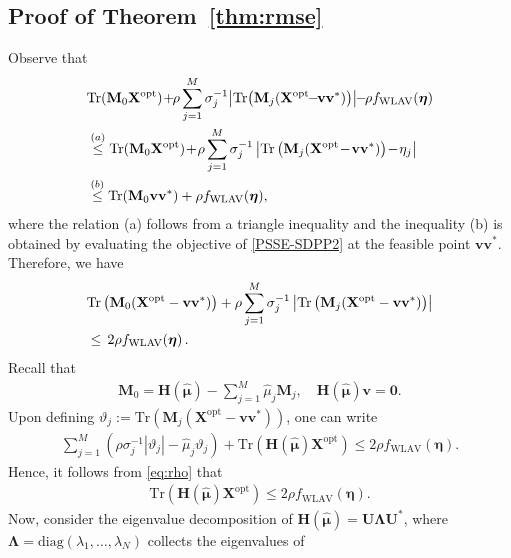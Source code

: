 \documentclass[journal,twoside]{IEEEtran}
\newcommand{\diag}{{\mathrm {diag}}}
\newcommand{\Tr}{\mathrm{Tr}}
\newcommand{\bv}{\mathbf{v}}
\newcommand{\bH}{\mathbf{H}}
\newcommand{\bM}{\mathbf{M}}
\newcommand{\bU}{\mathbf{U}}
\newcommand{\bX}{\mathbf{X}}
\newcommand{\bLambda}{\bm{\Lambda}}
\begin{document}
\subsection{Proof of Theorem~\ref{thm:rmse}}\label{appendix:rmse}
Observe that \begin{align}
&\Tr(\bM_0 {\bX}^{\mathrm{opt}})\!+\!\! \rho \sum_{j=1}^M \sigma_j^{-1}\!\left|\Tr\!\left(\bM_j({\bX}^{\mathrm{opt}}\!\!-\!\!\bv\bv^{*})\right)\right|\!\!-\!\!\rho f_{\mathrm{WLAV}}(\boldsymbol{\eta}) \notag  \\
&\stackrel{(a)}{\leq}\Tr(\bM_0{\bX}^{\mathrm{opt}})\!+\!\rho \sum_{j=1}^M \sigma_j^{-1}\left|\Tr\left(\bM_j({\bX}^{\mathrm{opt}}\!-\!\bv\bv^{*})\right)\!-\!\eta_j\right|  \notag \\
&\stackrel{(b)}{\leq} \Tr(\bM_0\bv\bv^{*}) + \rho f_{\mathrm{WLAV}}(\boldsymbol{\eta}), \label{bound}
\end{align}
where the relation (a) follows from a triangle inequality and the inequality (b) is obtained by evaluating the objective of \eqref{PSSE-SDPP2} at the feasible point $\bv\bv^{*}$.
Therefore, we have
\begin{align}
&\Tr\left(\bM_0({\bX}^{\mathrm{opt}}-\bv\bv^{*})\right) + \rho \sum_{j=1}^M \sigma_j^{-1}\left|\Tr\left(\bM_j({\bX}^{\mathrm{opt}}-\bv\bv^{*})\right)\right| \notag \\
&\leq\,  2\rho f_{\mathrm{WLAV}}(\boldsymbol{\eta})\, .
\label{bound2}
\end{align}
Recall that
\begin{align*}
\bM_{0} = \bH(\hat{\boldsymbol{\mu}}) - \sum_{j=1}^M\hat{\mu}_j\bM_{j}, \quad   \bH(\hat{\boldsymbol{\mu}})\bv = \mathbf{0}.
\end{align*}
Upon defining $\vartheta_j:=\Tr\left(\bM_j({\bX}^{\mathrm{opt}}-\bv\bv^{*})\right)$, one can write
\begin{align}
\!\!\!\!\sum_{j=1}^M (\rho \sigma_j^{-1}|\vartheta_j|-\hat{\mu}_j\vartheta_j)\!+\! \Tr(\bH(\hat{\boldsymbol{\mu}}){\bX}^{\mathrm{opt}})\!\leq\!
 2\rho f_{\mathrm{WLAV}}(\boldsymbol{\eta}).
\label{bound3}
\end{align}
Hence, it follows from \eqref{eq:rho} that
\begin{align}\label{boundX}
\Tr(\bH(\hat{\boldsymbol{\mu}}){\bX}^{\mathrm{opt}}) \leq 2\rho f_{\mathrm{WLAV}}(\boldsymbol{\eta}).
\end{align}
Now, consider the eigenvalue decomposition of $\bH(\hat{\boldsymbol{\mu}}) = \bU\bLambda\bU^{*}$,
where $\bLambda = \diag(\lambda_1,\ldots,\lambda_N)$ collects the eigenvalues of
\end{document}
